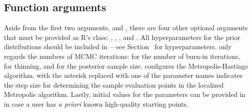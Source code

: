 \subsection{Function arguments}\label{subsec:function-arguments}
Aside from the first two arguments,  and , there are four other optional arguments that must be provided as R's  class: , , , and . All hyperparameters for the prior distributions should be included in ---see Section~ for hyperparameters.  only regards the numbers of MCMC iterations:  for the number of burn-in iterations,  for thinning, and  for the posterior sample size.  configures the Metropolis-Hastings algorithm.  with the asterisk replaced with one of the parameter names indicates the step size for determining the sample evaluation points in the localized Metropolis algorithm. Lastly, initial values for the parameters can be provided in  in case a user has \emph{a priori} known high-quality starting points.



